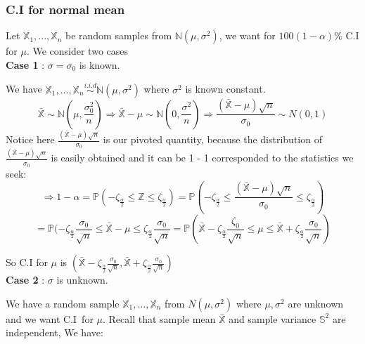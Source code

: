 \subsubsection{C.I for normal mean}

Let $\mathbb{X}_1, ..., \mathbb{X}_n$ be random samples from $\mathbb{N}(\mu,\sigma^2)$, 
we want for $100(1-\alpha)\%$ C.I for $\mu$. We consider two cases\\

\textbf{ Case 1 }: $\sigma = \sigma_0$ is known.

We have $\mathbb{X}_1, ..., \mathbb{X}_n \overset{i.i.d}{\sim} \mathbb{N}(\mu, \sigma^2)$ where $\sigma^2$ is known constant.
$$\bar{\mathbb{X}} \sim \mathbb{N}(\mu, \frac{\sigma_0^2}{n}) \Rightarrow 
\bar{\mathbb{X}} - \mu \sim \mathbb{N}(0, \frac{\sigma^2}{n}) \Rightarrow
\frac{(\bar{\mathbb{X}} - \mu) \sqrt{n}}{\sigma_0} \sim N(0, 1)$$
Notice here $\frac{(\bar{\mathbb{X}} - \mu) \sqrt{n}}{\sigma_0}$ is our pivoted quantity, because the distribution of $\frac{(\bar{\mathbb{X}} - \mu) \sqrt{n}}{\sigma_0}$ is easily obtained and it can be 1 - 1 corresponded to the statistics we seek:
$$\Rightarrow 1-\alpha = \mathbb{P}(-\zeta_{\frac{\alpha}{2}} \leq \mathbb{Z} \leq \zeta_{\frac{\alpha}{2}})
= \mathbb{P}(-\zeta_{\frac{\alpha}{2}} \leq \frac{(\bar{\mathbb{X}} - \mu) \sqrt{n}}{\sigma_0} \leq \zeta_{\frac{\alpha}{2}})$$
$$= \mathbb{P} (-\zeta_{\frac{\alpha}{2}} \frac{\sigma_0}{\sqrt{n}} \leq \bar{\mathbb{X}} - \mu \leq \zeta_{\frac{\alpha}{2}} \frac{\sigma_0}{\sqrt{n}}
= \mathbb{P}(\bar{\mathbb{X}} - \zeta_{\frac{\alpha}{2}} \frac{\zeta_0}{\sqrt{n}}
\leq \mu \leq \bar{\mathbb{X}} + \zeta_{\frac{\alpha}{2}} \frac{\sigma_0}{\sqrt{n}})$$

So C.I for $\mu$ is $(\bar{\mathbb{X}}- \zeta_{\frac{\alpha}{2}} \frac{\sigma_0}{\sqrt{n}},
\bar{\mathbb{X}} + \zeta_{\frac{\alpha}{2}} \frac{\sigma_0}{\sqrt{n}})$\\

\textbf{ Case 2 }: $\sigma$ is unknown.

We have a random sample $\mathbb{X}_1, ..., \mathbb{X}_n$ from $N(\mu, \sigma^2)$ where $\mu, \sigma^2$ are unknown and we want C.I\ for $\mu$. Recall that sample mean $\bar{\mathbb{X}}$ and sample variance $\mathbb{S}^2$ are independent, We have:

